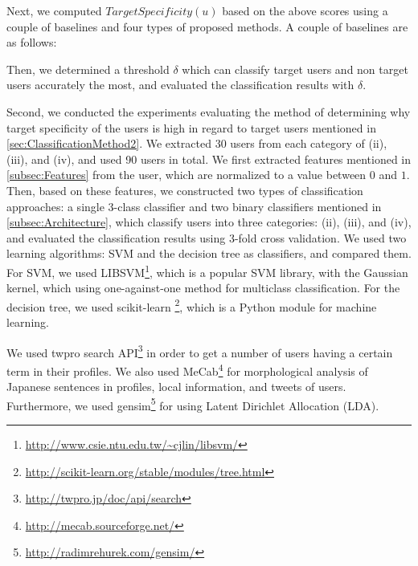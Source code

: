 Next, we computed $\mathit{TargetSpecificity}(u)$
based on the above scores using a couple of baselines and four types of
proposed methods.  A couple of baselines are as follows:




Then, we
determined a threshold $\delta$ which can classify target users and
non target users accurately the most, and evaluated the classification
results with $\delta$.

Second, we conducted the experiments evaluating the method of determining
why target specificity of the users is high in regard to target
users mentioned in \ref{sec:ClassificationMethod2}.  We extracted 30 users
from each category of (ii), (iii), and (iv), and used 90 users
in total.  We first extracted features mentioned in
\ref{subsec:Features} from the user, which are normalized to a
value between $0$ and $1$.  Then, based on these features, we
constructed two types of classification approaches: a single 3-class
classifier and
two binary classifiers mentioned in \ref{subsec:Architecture}, which
classify users into three categories:
(ii), (iii), and (iv), and evaluated the classification results using
3-fold cross validation.  We used two learning algorithms: SVM and the
decision tree as classifiers, and compared them.  For SVM, we used
LIBSVM\footnote{\url{http://www.csie.ntu.edu.tw/~cjlin/libsvm/}}, which
is a popular SVM library, with the Gaussian kernel, which using
one-against-one method for multiclass classification.  For the decision
tree, we used scikit-learn
\footnote{\url{http://scikit-learn.org/stable/modules/tree.html}}, which
is a Python module for machine learning.

We used twpro search API\footnote{\url{http://twpro.jp/doc/api/search}}
in order to get a number of users having a certain term in their
profiles.  We also used
MeCab\footnote{\url{http://mecab.sourceforge.net/}} for morphological
analysis of Japanese sentences in profiles, local information, and
tweets of users.  Furthermore, we used
gensim\footnote{\url{http://radimrehurek.com/gensim/}} for using Latent
Dirichlet Allocation (LDA).

